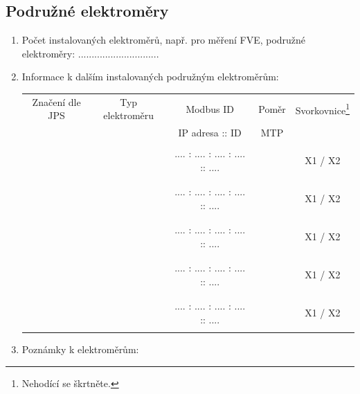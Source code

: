 {{        \subsection{Podružné elektroměry}
        \begin{enumerate}[label=\alph*)]
            \item Počet instalovaných elektroměrů, např. pro měření FVE, \newline podružné elektroměry: \vskip0.1in \hfill \hfill ..............................
            \item Informace k dalším instalovaných podružným elektroměrům:
            \vskip0.1in
            \begin{minipage}{\linewidth}
            \begin{tabular}{||c|c|c|c|c||}
            \hline
            Značení dle JPS& Typ elektroměru & Modbus ID& Poměr & Svorkovnice\footnote{Nehodící se škrtněte.}\\
             & &  IP adresa :: ID & MTP & \\
            \hline
             & & & & \\
             & & .... : .... : .... : ....   :: .... & & X1 / X2\\
             & & & & \\
            \hline
             & & & & \\
             & & .... : .... : .... : ....   :: .... & & X1 / X2\\
             & & & & \\
            \hline
             & & & & \\
             & & .... : .... : .... : ....   :: .... & & X1 / X2\\
             & & & & \\
            \hline
             & & & & \\
             & & .... : .... : .... : ....   :: .... & & X1 / X2\\
             & & & & \\
            \hline
             & & & & \\
             & & .... : .... : .... : ....   :: .... & & X1 / X2\\
             & & & & \\
            \hline
            \end{tabular}
            \end{minipage}
            \item Poznámky k elektroměrům:
            \begin{center}

\end{center}
\end{enumerate}}}
